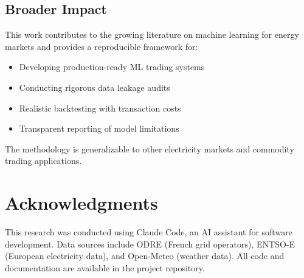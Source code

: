 \documentclass[11pt,a4paper]{article}
\begin{document}
\subsection{Broader Impact}

This work contributes to the growing literature on machine learning for energy markets and provides a reproducible framework for:
\begin{itemize}
    \item Developing production-ready ML trading systems
    \item Conducting rigorous data leakage audits
    \item Realistic backtesting with transaction costs
    \item Transparent reporting of model limitations
\end{itemize}

The methodology is generalizable to other electricity markets and commodity trading applications.

\section*{Acknowledgments}

This research was conducted using Claude Code, an AI assistant for software development. Data sources include ODRE (French grid operators), ENTSO-E (European electricity data), and Open-Meteo (weather data). All code and documentation are available in the project repository.
\end{document}
